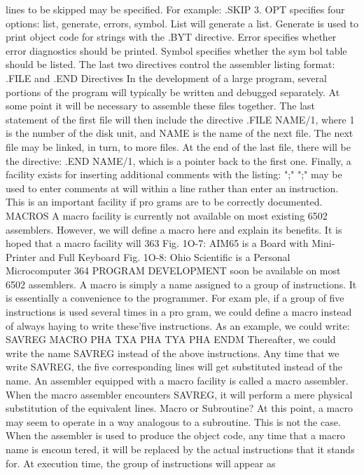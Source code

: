 {{{{{{{{{{{{{{{{{{{{{{{{{{{{{{{{{{{{{{{{{{{{{{{{{{{{{{{{{{{{{{{{{{{{{{{{{{{{{{{{{{{{{{{{{{{{{{{{{{{{{{{{{{{{{{{{{{{{{{{{{{{{{{{{{{{{{{{{{{{{lines to be skipped may be specified. For example: .SKIP 3.
OPT specifies four options: list, generate, errors, symbol. List
will generate a list. Generate is used to print object code for
strings with the .BYT directive. Error specifies whether error
diagnostics should be printed. Symbol specifies whether the sym
bol table should be listed.
The last two directives control the assembler listing format:
.FILE and .END Directives
In the development of a large program, several portions of the
program will typically be written and debugged separately. At
some point it will be necessary to assemble these files together.
The last statement of the first file will then include the directive
.FILE NAME/1, where 1 is the number of the disk unit, and
NAME is the name of the next file. The next file may be linked, in
turn, to more files. At the end of the last file, there will be the
directive: .END NAME/1, which is a pointer back to the first one.
Finally, a facility exists for inserting additional comments with
the listing: ";"
";" may be used to enter comments at will within a line rather
than enter an instruction. This is an important facility if pro
grams are to be correctly documented.
MACROS
A macro facility is currently not available on most existing
6502 assemblers. However, we will define a macro here and
explain its benefits. It is hoped that a macro facility will
363
Fig. 1O-7: AIM65 is a Board with Mini-Printer and Full Keyboard
Fig. 1O-8: Ohio Scientific is a Personal Microcomputer
364
PROGRAM DEVELOPMENT
soon be available on most 6502 assemblers.
A macro is simply a name assigned to a group of instructions.
It is essentially a convenience to the programmer. For exam
ple, if a group of five instructions is used several times in a pro
gram, we could define a macro instead of always haying to write
these'five instructions. As an example, we could write:
SAVREG MACRO PHA
TXA
PHA
TYA
PHA
ENDM
Thereafter, we could write the name SAVREG instead of the above
instructions.
Any time that we write SAVREG, the five corresponding lines
will get substituted instead of the name. An assembler equipped
with a macro facility is called a macro assembler. When the
macro assembler encounters SAVREG, it will perform a mere
physical substitution of the equivalent lines.
Macro or Subroutine?
At this point, a macro may seem to operate in a way analogous
to a subroutine. This is not the case. When the assembler is used
to produce the object code, any time that a macro name is encoun
tered, it will be replaced by the actual instructions that it stands
for. At execution time, the group of instructions will appear as
}}}}}}}}}}}}}}}}}}}}}}}}}}}}}}}}}}}}}}}}}}}}}}}}}}}}}}}}}}}}}}}}}}}}}}}}}}}}}}}}}}}}}}}}}}}}}}}}}}}}}}}}}}}}}}}}}}}}}}}}}}}}}}}}}}}}}}}}}}}}
